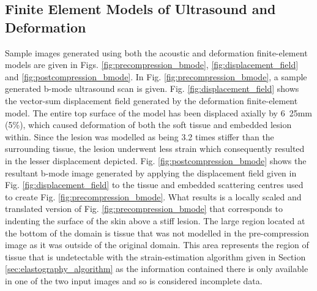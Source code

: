 		\subsection{Finite Element Models of Ultrasound and Deformation}
			\label{sec:femresults}
			Sample images generated using both the acoustic and deformation finite-element models are given in Figs. \ref{fig:precompression_bmode}, \ref{fig:displacement_field} and \ref{fig:postcompression_bmode}. In Fig. \ref{fig:precompression_bmode}, a sample generated b-mode ultrasound scan is given. Fig. \ref{fig:displacement_field} shows the vector-sum displacement field generated by the deformation finite-element model. The entire top surface of the model has been displaced axially by \unit{6.25}{mm} (\unit{5}{\%}), which caused deformation of both the soft tissue and embedded lesion within. Since the lesion was modelled as being 3.2 times stiffer than the surrounding tissue, the lesion underwent less strain which consequently resulted in the lesser displacement depicted. Fig. \ref{fig:postcompression_bmode} shows the resultant b-mode image generated by applying the displacement field given in Fig. \ref{fig:displacement_field} to the tissue and embedded scattering centres used to create Fig. \ref{fig:precompression_bmode}. What results is a locally scaled and translated version of Fig. \ref{fig:precompression_bmode} that corresponds to indenting the surface of the skin above a stiff lesion. The large  region located at the bottom of the domain is tissue that was not modelled in the pre-compression image as it was outside of the original domain. This area represents the region of tissue that is undetectable with the strain-estimation algorithm given in Section \ref{sec:elastography_algorithm} as the information contained there is only available in one of the two input images and so is considered incomplete data.

